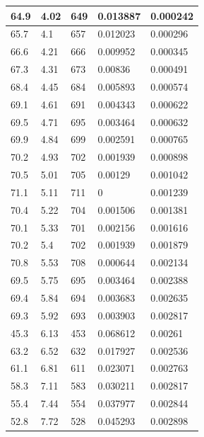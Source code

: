 \documentclass[%
 reprint,
 amsmath,amssymb,
 aps,
]{revtex4-2}
\begin{document}
\begin{table}[h!]
\begin{tabular}{|l|l|l|l|l|}
		64.9      & 4.02     & 649       & 0.013887    & 0.000242    \\ \hline
		65.7      & 4.1      & 657       & 0.012023    & 0.000296    \\ \hline
		66.6      & 4.21     & 666       & 0.009952    & 0.000345    \\ \hline
		67.3      & 4.31     & 673       & 0.00836     & 0.000491    \\ \hline
		68.4      & 4.45     & 684       & 0.005893    & 0.000574    \\ \hline
		69.1      & 4.61     & 691       & 0.004343    & 0.000622    \\ \hline
		69.5      & 4.71     & 695       & 0.003464    & 0.000632    \\ \hline
		69.9      & 4.84     & 699       & 0.002591    & 0.000765    \\ \hline
		70.2      & 4.93     & 702       & 0.001939    & 0.000898    \\ \hline
		70.5      & 5.01     & 705       & 0.00129     & 0.001042    \\ \hline
		71.1      & 5.11     & 711       & 0           & 0.001239    \\ \hline
		70.4      & 5.22     & 704       & 0.001506    & 0.001381    \\ \hline
		70.1      & 5.33     & 701       & 0.002156    & 0.001616    \\ \hline
		70.2      & 5.4      & 702       & 0.001939    & 0.001879    \\ \hline
		70.8      & 5.53     & 708       & 0.000644    & 0.002134    \\ \hline
		69.5      & 5.75     & 695       & 0.003464    & 0.002388    \\ \hline
		69.4      & 5.84     & 694       & 0.003683    & 0.002635    \\ \hline
		69.3      & 5.92     & 693       & 0.003903    & 0.002817    \\ \hline
		45.3      & 6.13     & 453       & 0.068612    & 0.00261     \\ \hline
		63.2      & 6.52     & 632       & 0.017927    & 0.002536    \\ \hline
		61.1      & 6.81     & 611       & 0.023071    & 0.002763    \\ \hline
		58.3      & 7.11     & 583       & 0.030211    & 0.002817    \\ \hline
		55.4      & 7.44     & 554       & 0.037977    & 0.002844    \\ \hline
		52.8      & 7.72     & 528       & 0.045293    & 0.002898    \\ \hline

\end{tabular}
\end{table}
\end{document}
